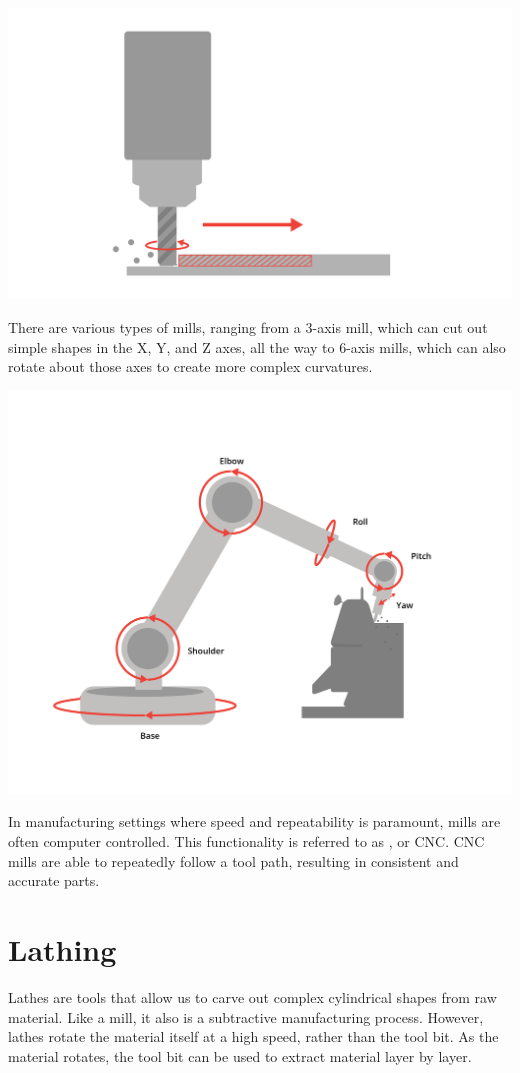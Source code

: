 \includegraphics[width=.75\textwidth]{mill1.png}


There are various types of mills, ranging from a 3-axis mill, which can cut out simple shapes in the X, Y, and Z axes, all the way to 6-axis mills, which can also rotate about those axes to create more complex curvatures.

\includegraphics[width=.75\textwidth]{sixAxisCnc.png}


In manufacturing settings where speed and repeatability is paramount, mills are often computer controlled. This functionality is referred to as , or CNC. CNC mills are able to repeatedly follow a tool path, resulting in consistent and accurate parts.

\section{Lathing}

Lathes are tools that allow us to carve out complex cylindrical shapes from raw material. Like a mill, it also is a subtractive manufacturing process. However, lathes rotate the material itself at a high speed, rather than the tool bit. As the material rotates, the tool bit can be used to extract material layer by layer. 

